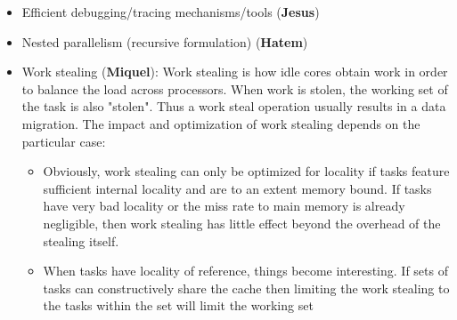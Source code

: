 \begin{itemize}
\begin{itemize}
\begin{itemize}
					task\_groups, OpenMP 3.0 Tasks). In this scenario scheduling involves fetching a task from the ready queue(s)
					or running the work-stealing loop if there are no ready tasks in the queues. This scheme has low overhead but
					supports mainly divide-and-conquer and parallel loop style of computation.
				\item  {\emph Task-dataflow}: In dataflow schemes (cite: OmpSs, OpenMP 4.0 tasks, TBB dependencies) there are two
					scheduling levels: 1) resolving dependencies to find ready tasks and 2) scheduling ready tasks to
					workers. The latter is in general performed as in task-parallel schemes. 
			\end{itemize} 
				Because of these differences, task-parallel runtimes tend to have smaller scheduling overheads compared to
				task-dataflow runtimes. It is an open research problem to reduce the overheads of task-dataflow schedulers in order to
				efficiently support tasks of finer granularity. Some researchers propose to replace the dependency-tracking scheduler
				with a ticket-based approach (cite: SWAN). Other groups propose to implement the parts of the scheduler in hardware,
				such as the dependency tracking mechanism (cite: HTSS, Nexus++) or the ready queues and task scheduler (cite:
				Carbon).
		\item Efficient debugging/tracing mechanisms/tools (\textbf{Jesus})
		\item Nested parallelism (recursive formulation) (\textbf{Hatem})
		\item Work stealing (\textbf{Miquel}):
			Work stealing is how idle cores obtain work in order to balance the load across processors. When work is stolen, the working
			set of the task is also "stolen". Thus a work steal operation usually results in a data migration.  The impact and
			optimization of work stealing depends on the particular case:
				\begin{itemize}
					\item Obviously, work stealing can only be optimized for locality if tasks feature sufficient
						internal locality and are to an extent memory bound. If tasks have very bad locality or the miss rate
						to main memory is already negligible, then work stealing has little effect beyond the overhead of the
						stealing itself. 
					\item When tasks have locality of reference, things become interesting. If sets of tasks can constructively
						share the cache then limiting the work stealing to the tasks within the set will limit the working set

\end{itemize}
\end{itemize}
\end{itemize}
